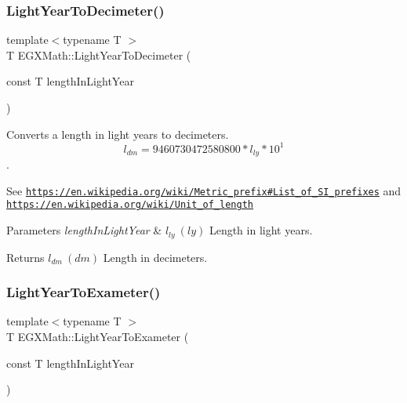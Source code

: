 \subsubsection{\texorpdfstring{Light\+Year\+To\+Decimeter()}{LightYearToDecimeter()}}
{\footnotesize\ttfamily template$<$typename T $>$ \\
T E\+G\+X\+Math\+::\+Light\+Year\+To\+Decimeter (\begin{DoxyParamCaption}\item[{const T}]{length\+In\+Light\+Year }\end{DoxyParamCaption})}



Converts a length in light years to decimeters. \[ l_{dm}=9460730472580800 * l_{ly} * 10^{1} \]. 

See \href{https://en.wikipedia.org/wiki/Metric_prefix#List_of_SI_prefixes}{\tt https\+://en.\+wikipedia.\+org/wiki/\+Metric\+\_\+prefix\#\+List\+\_\+of\+\_\+\+S\+I\+\_\+prefixes} and \href{https://en.wikipedia.org/wiki/Unit_of_length}{\tt https\+://en.\+wikipedia.\+org/wiki/\+Unit\+\_\+of\+\_\+length} 
\begin{DoxyParams}{Parameters}
{\em length\+In\+Light\+Year} & $ l_{ly}\ (ly)$ Length in light years. \\
\hline
\end{DoxyParams}
\begin{DoxyReturn}{Returns}
$ l_{dm}\ (dm)$ Length in decimeters. 
\end{DoxyReturn}
\mbox{\label{group___e_g_x_math-_conversions-_length_conversions-_astronomical-_light_year-_s_i_gabba57c37044b3b96ab0d58e17dcbac80}} 
\subsubsection{\texorpdfstring{Light\+Year\+To\+Exameter()}{LightYearToExameter()}}
{\footnotesize\ttfamily template$<$typename T $>$ \\
T E\+G\+X\+Math\+::\+Light\+Year\+To\+Exameter (\begin{DoxyParamCaption}\item[{const T}]{length\+In\+Light\+Year }\end{DoxyParamCaption})}



